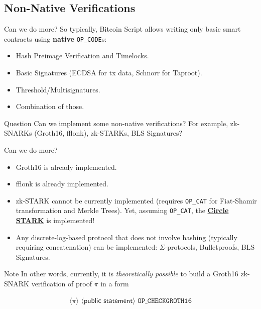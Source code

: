 \documentclass{zkdl-presentation-template}
\newcommand{\elem}[1]{\, \langle #1 \rangle \,}
\newcommand{\opcode}[1]{\, \texttt{#1} \,}
\newcommand{\cmark}{\textcolor{green!65!black}{\ding{51}}}%
\newcommand{\xmark}{\textcolor{red!80!black}{\ding{55}}}%
\begin{document}
    \subsection{Non-Native Verifications}
    \begin{frame}{Can we do more?}
        So typically, Bitcoin Script allows writing only basic smart contracts using \textbf{native} \texttt{OP\_CODE}s: 
        \begin{itemize}[label=\cmark]
            \item Hash Preimage Verification and Timelocks.\pause
            \item Basic Signatures (ECDSA for tx data, Schnorr for Taproot).\pause
            \item Threshold/Multisignatures.\pause
            \item Combination of those.\pause
        \end{itemize}

        \begin{alertblock}{Question}
            Can we implement some non-native verifications? For example, zk-SNARKs (Groth16, fflonk), zk-STARKs, BLS Signatures?
        \end{alertblock}
    \end{frame}

    \begin{frame}{Can we do more?}
        \begin{itemize}[label={}]
            \item \cmark \hspace{1px} Groth16 is already implemented.\pause
            \item \cmark \hspace{1px} \textsf{fflonk} is already implemented.\pause
            \item \xmark \hspace{1px} zk-STARK cannot be currently implemented (requires \texttt{OP\_CAT} for Fiat-Shamir transformation and Merkle Trees). Yet, assuming \texttt{OP\_CAT}, the \href{https://eprint.iacr.org/2024/278}{\textcolor{blue!70!white}{\textbf{Circle STARK}}} is implemented!\pause
            \item \cmark \hspace{1px} Any discrete-log-based protocol that does not involve hashing (typically requiring concatenation) can be implemented: $\Sigma$-protocols, Bulletproofs, BLS Signatures.\pause
        \end{itemize}

        \begin{block}{Note}
            In other words, currently, it is \textit{theoretically possible} to build a Groth16 zk-SNARK verification of proof $\pi$ in a form
            \begin{empheqboxed}
            \small
            \begin{align*}
                \elem{\pi} \elem{\textsf{public statement}} \opcode{OP\_CHECKGROTH16}
            \end{align*}
          \end{empheqboxed}
        \end{block}
    \end{frame}
\end{document}
